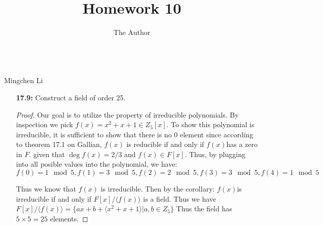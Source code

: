 \documentclass[11pt, oneside]{article}
\title{Homework 10}
\author{The Author}
\begin{document}
\begin{center}\\Mingchen Li\\ \end{center}
\thispagestyle{empty}



\hrulefill %





\begin{enumerate}

\item[{\bf 17.9:}] Construct a field of order 25.
\begin{proof}
Our goal is to utilize the property of irreducible polynomials. By inspection we pick $f(x)=x^2+x+1\in Z_5[x]$. To show this polynomial is irreducible, it is sufficient to show that there is no $0$ element since according to theorem 17.1 on Gallian, $f(x)$ is reducible if and only if $f(x)$has a zero in $F$. given that $\deg f(x)=2/3$ and $f(x)\in F[x]$. Thus, by plugging into all posible values into the polynomial, we have:
\[f(0)=1\mod 5, f(1)=3\mod 5, f(2)=2 \mod 5, f(3)=3\mod 5, f(4)=1\mod 5\]

Thus we know that $f(x)$ is irreducible. Then by the corollary: $f(x)$is irreducible if and only if $F[x]/ \langle f(x)\rangle$ is a field. Thus we have $F[x]/ \langle f(x)\rangle=\{ax+b+\langle x^2+x+1 \rangle|a,b\in Z_5\}$ Thus the field has $5\times 5 =25$ elements. 
\end{proof}




\end{enumerate}
\end{document}
